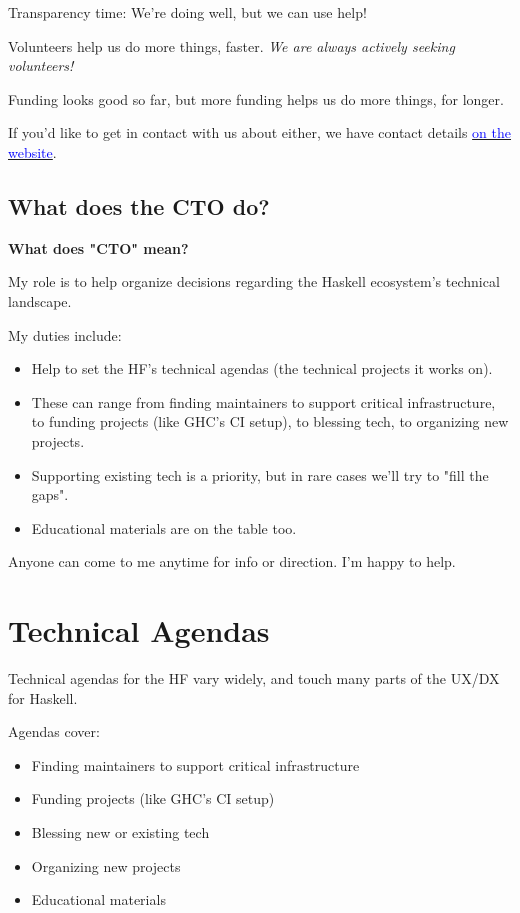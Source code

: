\documentclass[tikz]{beamer}
\newcommand{\blue}[1]{\textcolor{blue}{#1}}
\theoremstyle{definition}
\begin{document}
\frame
{ 
	Transparency time: We're doing well, but we can use help!
} 

\frame
{ 
	Volunteers help us do more things, faster. \textit{We are always actively seeking volunteers!}
} 

\frame
{ 
	Funding looks good so far, but more funding helps us do more things, for longer. 
} 

\frame
{ 
	If you'd like to get in contact with us about either, we have contact details \href{https://haskell.foundation/contact/}{\blue{on the website}}. 
	
} 

\subsection{What does the CTO do?}

\frame
{
	\textbf{What does "CTO" mean?} 

}

\frame
{ 
	My role is to help organize decisions regarding the Haskell ecosystem's technical landscape.
} 

\frame
{
	My duties include:
	
	\begin{itemize}
		\item Help to set the HF's technical agendas (the technical projects it works on).
		\item These can range from finding maintainers to support critical infrastructure, to 
		      funding projects (like GHC's CI setup), to blessing tech, to organizing new projects.
		\item Supporting existing tech is a priority, but in rare cases we'll try to "fill the gaps". 
		\item Educational materials are on the table too. 
    \end{itemize}	 

}


\frame
{
	Anyone can come to me anytime for info or direction. I'm happy to help. 
}

\section{Technical Agendas}
\frame
{ 
	Technical agendas for the HF vary widely, and touch many parts of the UX/DX for Haskell. 
}

\frame
{
  Agendas cover: 
  
  	\begin{itemize}
		\item Finding maintainers to support critical infrastructure
		\item Funding projects (like GHC's CI setup)
		\item Blessing new or existing tech
		\item Organizing new projects
		\item Educational materials  	
  	\end{itemize}

}
\end{document}

